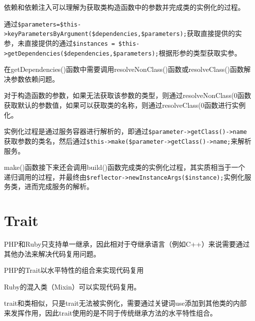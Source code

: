 依赖和依赖注入可以理解为获取类构造函数中的参数并完成类的实例化的过程。

\begin{compactitem}
\item 通过\texttt{\$parameters=\$this->keyParametersByArgument(\$dependencies,\$parameters);}获取直接提供的实参，未直接提供的通过\texttt{\$instances = \$this->getDependencies(\$dependencies,\$parameters);}根据形参的类型获取实参。


\item 在getDependencies()函数中需要调用resolveNonClass()函数或resolveClass()函数解决参数依赖问题。

对于构造函数的参数，如果无法获取该参数的类型，则通过resolveNonClass(0函数获取默认的参数值，如果可以获取类的名称，则通过resolveClass(0函数进行实例化。

\item 实例化过程是通过服务容器进行解析的，即通过\texttt{\$parameter->getClass()->name}获取参数的类名，然后通过\texttt{\$this->make(\$parameter->getClass()->name;}来解析服务。

\item make()函数接下来还会调用build()函数完成类的实例化过程，其实质相当于一个递归调用的过程，并最终由\texttt{\$reflector->newInstanceArgs(\$instance);}实例化服务类，进而完成服务的解析。
\end{compactitem}

\chapter{Trait}

PHP和Ruby只支持单一继承，因此相对于夺继承语言（例如C++）来说需要通过其他办法来解决代码复用问题。

\begin{compactitem}
\item PHP的Trait以水平特性的组合来实现代码复用
\item Ruby的混入类（Mixin）可以实现代码复用。
\end{compactitem}

trait和类相似，只是trait无法被实例化，需要通过关键词use添加到其他类的内部来发挥作用，因此trait使用的是不同于传统继承方法的水平特性组合。



